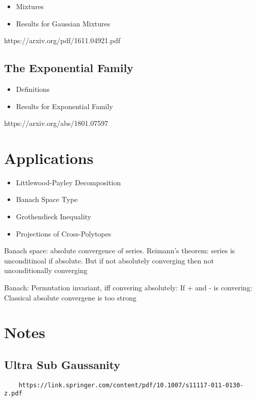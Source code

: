 \documentclass[10pt]{article}
\newcommand{\1}{\textbf{1}}
\theoremstyle{remark}
\theoremstyle{definition}
\begin{document}
\begin{itemize}
	\item Mixtures
	\item Results for Gaussian Mixtures
\end{itemize}

https://arxiv.org/pdf/1611.04921.pdf

\subsection{The Exponential Family}

\begin{itemize}
	\item Definitions
	\item Results for Exponential Family
\end{itemize}

https://arxiv.org/abs/1801.07597

\section{Applications}

\begin{itemize}
	\item Littlewood-Payley Decomposition
	\item Banach Space Type
	\item Grothendieck Inequality
	\item Projections of Cross-Polytopes
\end{itemize}

Banach space: absolute convergence of series. 
	Reimann's theorem: series is unconditinoal if absolute. But if not absolutely converging then not unconditionally converging

Banach: Permutation invariant, iff convering absolutely: If + and - is convering: Classical absolute convergene is too strong

\section{Notes}

\subsection{Ultra Sub Gaussanity}

\begin{verbatim}
	https://link.springer.com/content/pdf/10.1007/s11117-011-0130-z.pdf
\end{verbatim}
\end{document}
